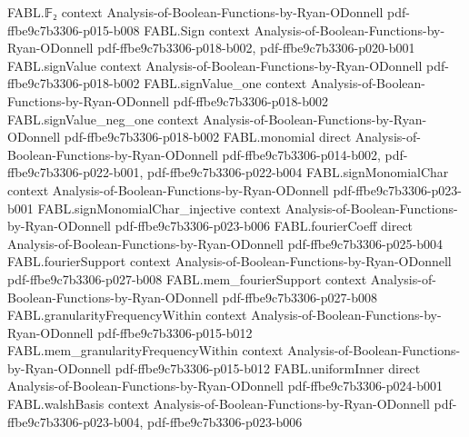 \begin{theorem}
\label{FABL.IsLocalTester.close_of_acceptanceProbability_ge}
\leanok
{}
\proofstep
  {FABL.𝔽₂}
  {context}
  {Analysis-of-Boolean-Functions-by-Ryan-ODonnell}
  {pdf-ffbe9c7b3306-p015-b008}
\proofstep
  {FABL.Sign}
  {context}
  {Analysis-of-Boolean-Functions-by-Ryan-ODonnell}
  {pdf-ffbe9c7b3306-p018-b002,
    pdf-ffbe9c7b3306-p020-b001}
\proofstep
  {FABL.signValue}
  {context}
  {Analysis-of-Boolean-Functions-by-Ryan-ODonnell}
  {pdf-ffbe9c7b3306-p018-b002}
\proofstep
  {FABL.signValue_one}
  {context}
  {Analysis-of-Boolean-Functions-by-Ryan-ODonnell}
  {pdf-ffbe9c7b3306-p018-b002}
\proofstep
  {FABL.signValue_neg_one}
  {context}
  {Analysis-of-Boolean-Functions-by-Ryan-ODonnell}
  {pdf-ffbe9c7b3306-p018-b002}
\proofstep
  {FABL.monomial}
  {direct}
  {Analysis-of-Boolean-Functions-by-Ryan-ODonnell}
  {pdf-ffbe9c7b3306-p014-b002,
    pdf-ffbe9c7b3306-p022-b001,
    pdf-ffbe9c7b3306-p022-b004}
\proofstep
  {FABL.signMonomialChar}
  {context}
  {Analysis-of-Boolean-Functions-by-Ryan-ODonnell}
  {pdf-ffbe9c7b3306-p023-b001}
\proofstep
  {FABL.signMonomialChar_injective}
  {context}
  {Analysis-of-Boolean-Functions-by-Ryan-ODonnell}
  {pdf-ffbe9c7b3306-p023-b006}
\proofstep
  {FABL.fourierCoeff}
  {direct}
  {Analysis-of-Boolean-Functions-by-Ryan-ODonnell}
  {pdf-ffbe9c7b3306-p025-b004}
\proofstep
  {FABL.fourierSupport}
  {context}
  {Analysis-of-Boolean-Functions-by-Ryan-ODonnell}
  {pdf-ffbe9c7b3306-p027-b008}
\proofstep
  {FABL.mem_fourierSupport}
  {context}
  {Analysis-of-Boolean-Functions-by-Ryan-ODonnell}
  {pdf-ffbe9c7b3306-p027-b008}
\proofstep
  {FABL.granularityFrequencyWithin}
  {context}
  {Analysis-of-Boolean-Functions-by-Ryan-ODonnell}
  {pdf-ffbe9c7b3306-p015-b012}
\proofstep
  {FABL.mem_granularityFrequencyWithin}
  {context}
  {Analysis-of-Boolean-Functions-by-Ryan-ODonnell}
  {pdf-ffbe9c7b3306-p015-b012}
\proofstep
  {FABL.uniformInner}
  {direct}
  {Analysis-of-Boolean-Functions-by-Ryan-ODonnell}
  {pdf-ffbe9c7b3306-p024-b001}
\proofstep
  {FABL.walshBasis}
  {context}
  {Analysis-of-Boolean-Functions-by-Ryan-ODonnell}
  {pdf-ffbe9c7b3306-p023-b004,
    pdf-ffbe9c7b3306-p023-b006}

\end{theorem}
